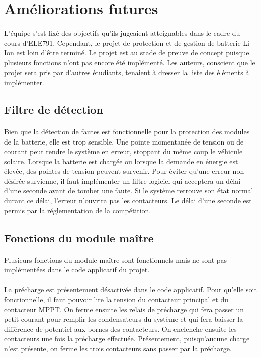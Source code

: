 \section{Améliorations futures}

	\paragraph{}
	L'équipe s'est fixé des objectifs qu'ils jugeaient atteignables dans le cadre du cours d'ELE791. Cependant, le projet de protection et de gestion de batterie Li-Ion est loin d'être terminé. Le projet est au stade de preuve de concept puisque plusieurs fonctions n'ont pas encore été implémenté. Les auteurs, conscient que le projet sera pris par d'autres étudiants, tenaient à dresser la liste des éléments à implémenter.

	\subsection{Filtre de détection}

		\paragraph{}
		Bien que la détection de fautes est fonctionnelle pour la protection des modules de la batterie, elle est trop sensible. Une pointe momentanée de tension ou de courant peut rendre le système en erreur, stoppant du même coup le véhicule solaire. Lorsque la batterie est chargée ou lorsque la demande en énergie est élevée, des pointes de tension peuvent survenir. Pour éviter qu'une erreur non désirée survienne, il faut implémenter un filtre logiciel qui acceptera un délai d'une seconde avant de tomber une faute. Si le système retrouve son état normal durant ce délai, l'erreur n'ouvrira pas les contacteurs. Le délai d'une seconde est permis par la réglementation de la compétition.

	\subsection{Fonctions du module maître}

		\paragraph{}
		Plusieurs fonctions du module maître sont fonctionnels mais ne sont pas implémentées dans le code applicatif du projet.

		\paragraph{}
		La précharge est présentement désactivée dans le code applicatif. Pour qu'elle soit fonctionnelle, il faut pouvoir lire la tension du contacteur principal et du contacteur MPPT. On ferme ensuite les relais de précharge qui fera passer un petit courant pour remplir les condensateurs du système et qui fera baisser la différence de potentiel aux bornes des contacteurs. On enclenche ensuite les contacteurs une fois la précharge effectuée. Présentement, puisqu'aucune charge n'est présente, on ferme les trois contacteurs sans passer par la précharge.

